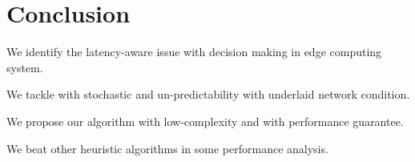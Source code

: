 \section{Conclusion}
We identify the latency-aware issue with decision making in edge computing system.

We tackle with stochastic and un-predictability with underlaid network condition.

We propose our algorithm with low-complexity and with performance guarantee.

We beat other heuristic algorithms in some performance analysis.